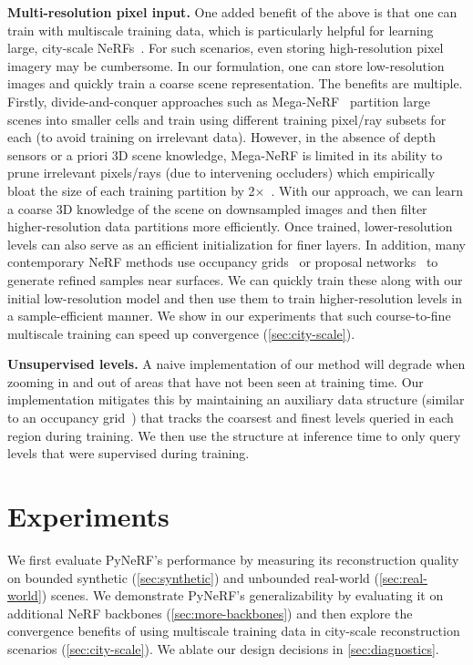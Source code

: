 \documentclass{article}
\newcommand{\method}{PyNeRF\xspace}
\begin{document}
{\bf Multi-resolution pixel input.} One added benefit of the above is that one can train with multiscale training data, which is particularly helpful for learning large, city-scale NeRFs~\cite{Turki_2022_CVPR, tancik2022blocknerf, xiangli2022bungeenerf, turki2023suds, xu2023gridguided}. For such scenarios, even storing high-resolution pixel imagery may be cumbersome. In our formulation, one can store low-resolution images and quickly train a coarse scene representation. The benefits are multiple. Firstly, divide-and-conquer approaches such as Mega-NeRF~\cite{turki2023suds} partition large scenes into smaller cells and train using different training pixel/ray subsets for each (to avoid training on irrelevant data). However, in the absence of depth sensors or a priori 3D scene knowledge, Mega-NeRF is limited in its ability to prune irrelevant pixels/rays (due to intervening occluders) which empirically bloat the size of each training partition by 2×~\cite{Turki_2022_CVPR}. With our approach, we can learn a coarse 3D knowledge of the scene on downsampled images and then filter higher-resolution data partitions more efficiently. Once trained, lower-resolution levels can also serve as an efficient initialization for finer layers. In addition, many contemporary NeRF methods use occupancy grids~\cite{mueller2022instant} or proposal networks~\cite{barron2022mipnerf360} to generate refined samples near surfaces. We can quickly train these along with our initial low-resolution model and then use them to train higher-resolution levels in a sample-efficient manner. We show in our experiments that such course-to-fine multiscale training can speed up convergence (\cref{sec:city-scale}).

{\bf Unsupervised levels.} A naive implementation of our method will degrade when zooming in and out of areas that have not been seen at training time. Our implementation mitigates this by maintaining an auxiliary data structure (similar to an occupancy grid~\cite{mueller2022instant}) that tracks the coarsest and finest levels queried in each region during training. We then use the structure at inference time to only query levels that were supervised during training.

\section{Experiments}

We first evaluate \method's performance by measuring its reconstruction quality on bounded synthetic (\cref{sec:synthetic}) and unbounded real-world (\cref{sec:real-world}) scenes. 
We demonstrate \method's generalizability by evaluating it on additional NeRF backbones (\cref{sec:more-backbones}) and then explore the convergence benefits of using multiscale training data in city-scale reconstruction scenarios (\cref{sec:city-scale}). We ablate our design decisions in \cref{sec:diagnostics}.
\end{document}

